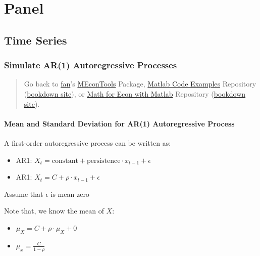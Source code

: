 \documentclass[
]{book}
\begin{document}
\hypertarget{panel}{%
\chapter{Panel}\label{panel}}

\hypertarget{time-series}{%
\section{Time Series}\label{time-series}}

\hypertarget{simulate-ar1-autoregressive-processes}{%
\subsection{Simulate AR(1) Autoregressive Processes}\label{simulate-ar1-autoregressive-processes}}

\begin{quote}
Go back to \href{http://fanwangecon.github.io/}{fan}'s \href{https://fanwangecon.github.io/MEconTools/}{MEconTools} Package, \href{https://fanwangecon.github.io/M4Econ/}{Matlab Code Examples} Repository (\href{https://fanwangecon.github.io/M4Econ/bookdown}{bookdown site}), or \href{https://fanwangecon.github.io/Math4Econ/}{Math for Econ with Matlab} Repository (\href{https://fanwangecon.github.io/Math4Econ/bookdown}{bookdown site}).
\end{quote}

\hypertarget{mean-and-standard-deviation-for-ar1-autoregressive-process}{%
\subsubsection{Mean and Standard Deviation for AR(1) Autoregressive Process}\label{mean-and-standard-deviation-for-ar1-autoregressive-process}}

A first-order autoregressive process can be written as:

\begin{itemize}
\item
  AR1:
  \(X_t =\textrm{constant}+\textrm{persistence}\cdot x_{t-1} +\epsilon\)
\item
  AR1: \(X_t =C+\rho \cdot x_{t-1} +\epsilon\)
\end{itemize}

Assume that \(\epsilon\) is mean zero

Note that, we know the mean of \(X\):

\begin{itemize}
\item
  \(\displaystyle \mu_X =C+\rho \cdot \mu_X +0\)
\item
  \(\displaystyle \mu_x =\frac{C}{1-\rho }\)
\end{itemize}
\end{document}
